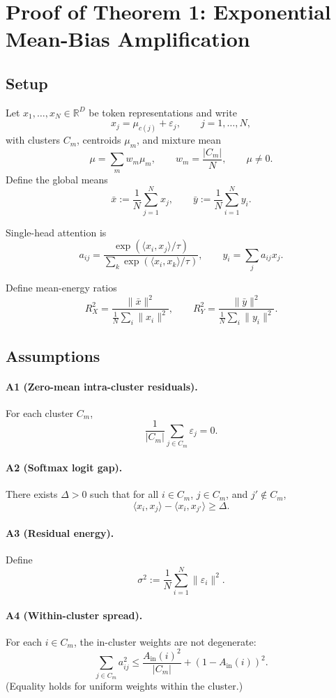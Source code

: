 \section{Proof of Theorem 1: Exponential Mean-Bias Amplification}

\subsection{Setup}

Let $x_1,\dots,x_N\in\mathbb{R}^D$ be token representations and write
\[
 x_j = \mu_{c(j)} + \varepsilon_j,
\qquad j=1,\dots,N,
\]
with clusters $C_m$, centroids $\mu_m$, and mixture mean
\[
 \mu = \sum_m w_m \mu_m,
\qquad w_m = \frac{|C_m|}{N},
\qquad \mu\neq 0.
\]
Define the global means
\[
 \bar x := \frac{1}{N}\sum_{j=1}^N x_j,
\qquad
 \bar y := \frac{1}{N}\sum_{i=1}^N y_i.
\]

Single-head attention is
\[
 a_{ij} = \frac{\exp(\langle x_i,x_j\rangle/\tau)}{\sum_k \exp(\langle x_i,x_k\rangle/\tau)},
\qquad
 y_i = \sum_j a_{ij} x_j.
\]

Define mean-energy ratios
\[
 R_X^2 = \frac{\|\bar x\|^2}{\frac1N\sum_i \|x_i\|^2},
\qquad
 R_Y^2 = \frac{\|\bar y\|^2}{\frac1N\sum_i \|y_i\|^2}.
\]

\subsection{Assumptions}

\paragraph{A1 (Zero-mean intra-cluster residuals).}
For each cluster $C_m$,
\[
 \frac{1}{|C_m|}\sum_{j\in C_m} \varepsilon_j = 0.
\]

\paragraph{A2 (Softmax logit gap).}
There exists $\Delta>0$ such that for all $i\in C_m$, $j\in C_m$, and $j'\notin C_m$,
\[
 \langle x_i,x_j\rangle - \langle x_i,x_{j'}\rangle \ge \Delta.
\]

\paragraph{A3 (Residual energy).}
Define
\[
 \sigma^2 := \frac{1}{N}\sum_{i=1}^N \|\varepsilon_i\|^2.
\]

\paragraph{A4 (Within-cluster spread).}
For each $i\in C_m$, the in-cluster weights are not degenerate:
\[
 \sum_{j\in C_m} a_{ij}^2 \le \frac{A_{\mathrm{in}}(i)^2}{|C_m|} + (1-A_{\mathrm{in}}(i))^2.
\]
(Equality holds for uniform weights within the cluster.)

